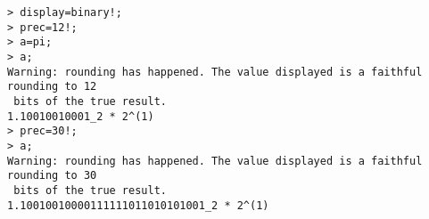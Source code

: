 \begin{center}\begin{minipage}{15cm}\begin{Verbatim}[frame=single]
> display=binary!;
> prec=12!;
> a=pi;
> a;
Warning: rounding has happened. The value displayed is a faithful rounding to 12
 bits of the true result.
1.10010010001_2 * 2^(1)
> prec=30!;
> a;
Warning: rounding has happened. The value displayed is a faithful rounding to 30
 bits of the true result.
1.10010010000111111011010101001_2 * 2^(1)
\end{Verbatim}
\end{minipage}\end{center}
